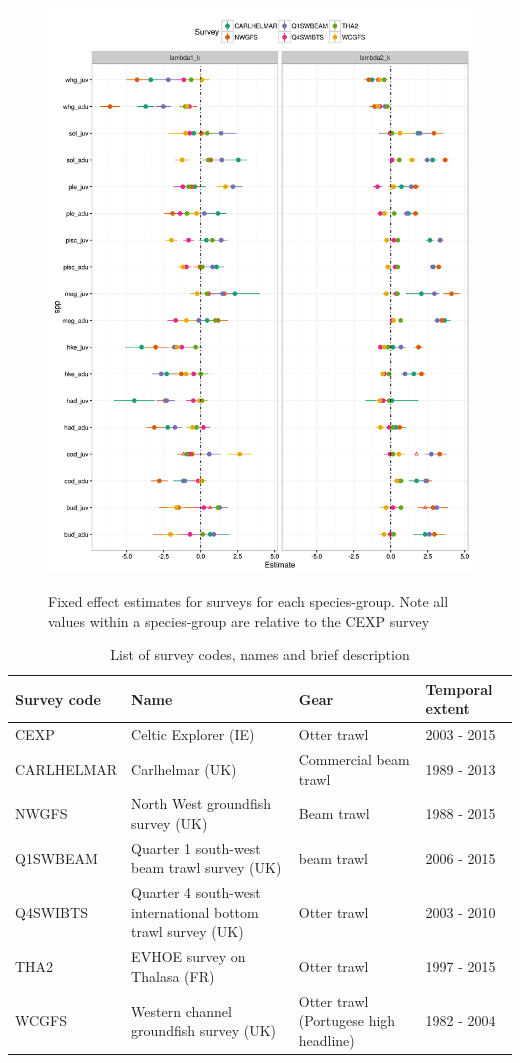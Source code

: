 \documentclass{article}
\begin{document}
\begin{figure}
\begin{center}
	\includegraphics[width = 0.9\linewidth]{"figures/Suppl - QEstimatesALL"}
	\label{fig:S7}
	\caption{Fixed effect estimates for surveys for each species-group. Note
	all values within a species-group are relative to the CEXP survey}
	\end{center}
\end{figure}



\begin{table}
	\caption{List of survey codes, names and brief description}
	\center
	\begin{tabular}{ p{3cm} p{4cm} p{4cm} p{3cm} }
		\hline
		Survey code    & Name 	& Gear & Temporal extent \\
		\hline
		CEXP           & Celtic Explorer (IE)   & Otter trawl & 2003 - 2015 \\
		CARLHELMAR     & Carlhelmar (UK)	& Commercial beam trawl & 1989 - 2013 \\
		NWGFS          & North West groundfish survey (UK) & Beam trawl & 1988 - 2015 \\
		Q1SWBEAM       & Quarter 1 south-west beam trawl survey (UK) 	& beam trawl & 2006 - 2015 \\
		Q4SWIBTS       & Quarter 4 south-west international bottom trawl survey (UK) & Otter trawl & 2003 - 2010 \\
		THA2           & EVHOE survey on Thalasa (FR) & Otter trawl & 1997 - 2015 \\
		WCGFS          & Western channel groundfish survey (UK) & Otter
		trawl (Portugese high headline) & 1982 - 2004 \\
		\hline
	\end{tabular}
\end{table}
\end{document}
